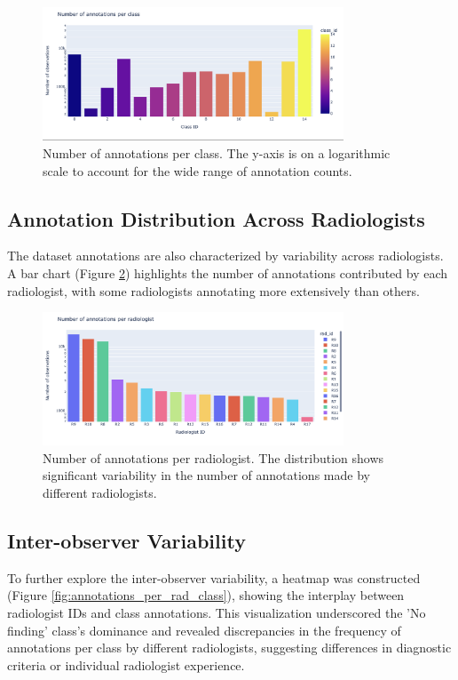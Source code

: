 \documentclass[12pt,oneside]{book} %
\begin{document}
\begin{figure}[H]
    \centering
    \includegraphics[width=0.8\textwidth]{../results/annotations_per_class.png}
    \caption{Number of annotations per class. The y-axis is on a logarithmic scale to account for the wide range of annotation counts.}
    \label{fig:annotations_per_class}
\end{figure}

\subsection{Annotation Distribution Across Radiologists}
The dataset annotations are also characterized by variability across
radiologists. A bar chart (Figure \ref{fig:annotations_per_rad}) highlights the
number of annotations contributed by each radiologist, with some radiologists
annotating more extensively than others.

\begin{figure}[H]
    \centering
    \includegraphics[width=0.8\textwidth]{../results/annotations_per_rad.png}
    \caption{Number of annotations per radiologist. The distribution shows significant variability in the number of annotations made by different radiologists.}
    \label{fig:annotations_per_rad}
\end{figure}

\subsection{Inter-observer Variability}

To further explore the inter-observer variability, a heatmap was constructed
(Figure \ref{fig:annotations_per_rad_class}), showing the interplay between
radiologist IDs and class annotations. This visualization underscored the 'No
finding' class's dominance and revealed discrepancies in the frequency of
annotations per class by different radiologists, suggesting differences in
diagnostic criteria or individual radiologist experience.
\end{document}

